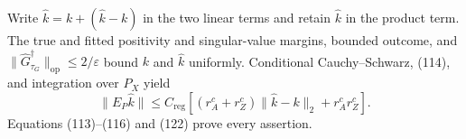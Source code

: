 Write \(\widehat k=k+(\widehat k-k)\) in the two linear terms and retain \(\widehat k\) in the product term.  The true and fitted positivity and singular-value margins, bounded outcome, and
\(\|\widehat G_{\tau_G}^{\dagger}\|_{\mathrm{op}}\leq2/\varepsilon\)
bound \(k\) and \(\widehat k\) uniformly.  Conditional Cauchy--Schwarz, (114), and integration over \(P_X\) yield
\[
 \|E_P\widehat k\|
 \leq C_{\mathrm{reg}}
 \left[(r_A^c+r_Z^c)\|\widehat k-k\|_2+r_A^cr_Z^c\right]. \tag{122}
\]
Equations (113)--(116) and (122) prove every assertion.
